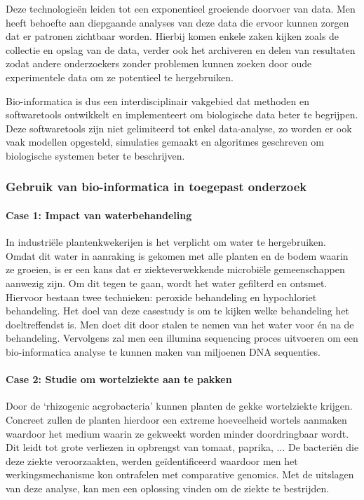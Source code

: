 \documentclass[a4paper,kul]{kulakarticle} %
\begin{document}
Deze technologieën leiden tot een exponentieel groeiende doorvoer van data. Men heeft behoefte aan diepgaande analyses van deze data die ervoor kunnen zorgen dat er patronen zichtbaar worden. Hierbij komen enkele zaken kijken zoals de collectie en opslag van de data, verder ook het archiveren en delen van resultaten zodat andere onderzoekers zonder problemen kunnen zoeken door oude experimentele data om ze potentieel te hergebruiken. %
\newline

Bio-informatica is dus een interdisciplinair vakgebied dat methoden en softwaretools ontwikkelt en implementeert om biologische data beter te begrijpen. Deze softwaretools zijn niet gelimiteerd tot enkel data-analyse, zo worden er ook vaak modellen opgesteld, simulaties gemaakt en algoritmes geschreven om biologische systemen beter te beschrijven. 
\subsubsection{Gebruik van bio-informatica in toegepast onderzoek}
\paragraph{Case 1: Impact van waterbehandeling}
In industriële plantenkwekerijen is het verplicht om water te hergebruiken. Omdat dit water in aanraking is gekomen met alle planten en de bodem waarin ze groeien, is er een kans dat er ziekteverwekkende microbiële gemeenschappen aanwezig zijn. Om dit tegen te gaan, wordt het water gefilterd en ontsmet. Hiervoor bestaan twee technieken: peroxide behandeling en hypochloriet behandeling. Het doel van deze casestudy is om te kijken welke behandeling het doeltreffendst is. Men doet dit door stalen te nemen van het water voor én na de behandeling. Vervolgens zal men een illumina sequencing proces uitvoeren om een bio-informatica analyse te kunnen maken van miljoenen DNA sequenties.
\paragraph{Case 2: Studie om wortelziekte aan te pakken}
Door de `rhizogenic acgrobacteria' kunnen planten de gekke wortelziekte krijgen. Concreet zullen de planten hierdoor een extreme hoeveelheid wortels aanmaken waardoor het medium waarin ze gekweekt worden minder doordringbaar wordt. Dit leidt tot grote verliezen in opbrengst van tomaat, paprika, $\ldots$ De bacteriën die deze ziekte veroorzaakten, werden geïdentificeerd waardoor men het werkingsmechanisme kon ontrafelen met comparative genomics. Met de uitslagen van deze analyse, kan men een oplossing vinden om de ziekte te bestrijden. 
\newpage
\end{document}
